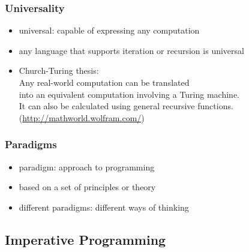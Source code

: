 \documentclass[dvipsnames]{beamer}
\theoremstyle{plain}
\begin{document}
\begin{frame}
  \frametitle{Universality}

  \begin{itemize}
    \item \alert{universal}: capable of expressing any computation
    \item any language that supports iteration or recursion is universal

    \pause
    \bigskip
    \item Church-Turing thesis:\\
    \smallskip
    Any real-world computation can be translated\\
    into an equivalent computation involving a Turing machine.\\
    \medskip
    It can also be calculated using general recursive functions.\\
    \smallskip
    (\url{http://mathworld.wolfram.com/})
  \end{itemize}
\end{frame}

\begin{frame}
  \frametitle{Paradigms}

  \begin{itemize}
    \item \alert{paradigm}: approach to programming
    \item based on a set of principles or theory

    \medskip
    \item different paradigms: different ways of thinking
  \end{itemize}
\end{frame}

\subsection{Imperative Programming}
\end{document}
